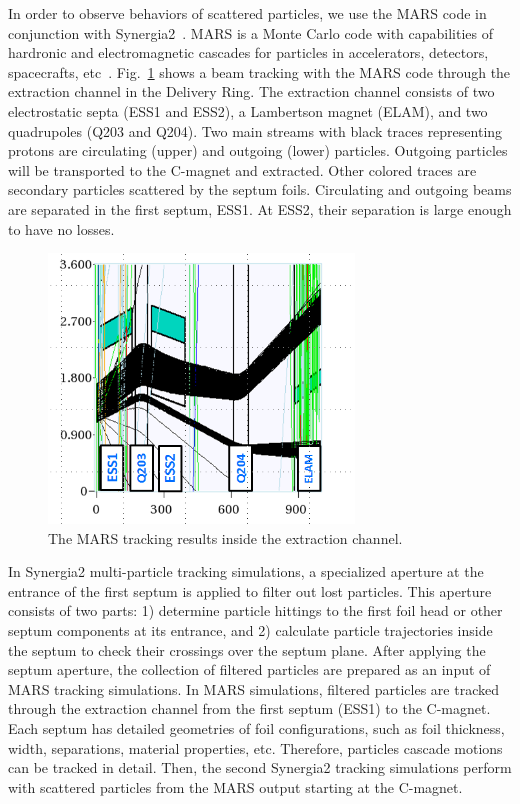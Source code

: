 \documentclass[aps,prstab,onecolumn,preprint]{revtex4-1}
\begin{document}
In order to observe behaviors of scattered particles, we use the MARS code in conjunction with Synergia2~\cite{mars1}. MARS is a Monte Carlo code with capabilities of hardronic and electromagnetic cascades for particles in accelerators, detectors, spacecrafts, etc~\cite{mars2}. Fig.~\ref{fig:beamloss1} shows a beam tracking with the MARS code through the extraction channel in the Delivery Ring. The extraction channel consists of two electrostatic septa (ESS1 and ESS2), a Lambertson magnet (ELAM), and two quadrupoles (Q203 and Q204). Two main streams with black traces representing protons are circulating (upper) and outgoing (lower) particles. Outgoing particles will be transported to the C-magnet and extracted. Other colored traces are secondary particles scattered by the septum foils. Circulating and outgoing beams are separated in the first septum, ESS1. At ESS2, their separation is large enough to have no losses. 

\begin{figure}[!tbp]
  \includegraphics[width=3.2in]{img/fig_beamloss1}
  \caption{\label{fig:beamloss1}The MARS tracking results inside the extraction channel.}
\end{figure}

In Synergia2 multi-particle tracking simulations, a specialized aperture at the entrance of the first septum is applied to filter out lost particles. This aperture consists of two parts: 1) determine particle hittings to the first foil head or other septum components at its entrance, and 2) calculate particle trajectories inside the septum to check their crossings over the septum plane. After applying the septum aperture, the collection of filtered particles are prepared as an input of MARS tracking simulations. In MARS simulations, filtered particles are tracked through the extraction channel from the first septum (ESS1) to the C-magnet. Each septum has detailed geometries of foil configurations, such as foil thickness, width, separations, material properties, etc. Therefore, particles cascade motions can be tracked in detail. Then, the second Synergia2 tracking simulations perform with scattered particles from the MARS output starting at the C-magnet. 
\end{document}
